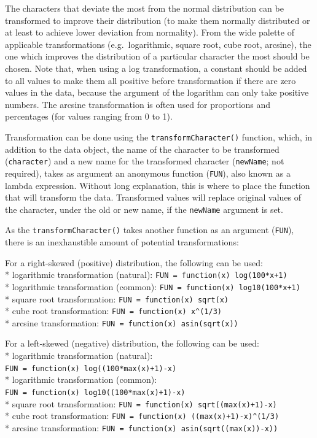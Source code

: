 \documentclass[
  11pt,
  a4paper]{article}
\begin{document}
The characters that deviate the most from the normal distribution can be
transformed to improve their distribution (to make them normally
distributed or at least to achieve lower deviation from normality). From
the wide palette of applicable transformations (e.g.~logarithmic, square
root, cube root, arcsine), the one which improves the distribution of a
particular character the most should be chosen. Note that, when using a
log transformation, a constant should be added to all values to make
them all positive before transformation if there are zero values in the
data, because the argument of the logarithm can only take positive
numbers. The arcsine transformation is often used for proportions and
percentages (for values ranging from 0 to 1).

Transformation can be done using the \texttt{transformCharacter()}
function, which, in addition to the data object, the name of the
character to be transformed (\texttt{character}) and a new name for the
transformed character (\texttt{newName}; not required), takes as
argument an anonymous function (\texttt{FUN}), also known as a lambda
expression. Without long explanation, this is where to place the
function that will transform the data. Transformed values will replace
original values of the character, under the old or new name, if the
\texttt{newName} argument is set.

As the \texttt{transformCharacter()} takes another function as an
argument (\texttt{FUN}), there is an inexhaustible amount of potential
transformations:

For a right-skewed (positive) distribution, the following can be used:\\
* logarithmic transformation (natural):
\texttt{FUN\ =\ function(x)\ log(100*x+1)}\\
* logarithmic transformation (common):
\texttt{FUN\ =\ function(x)\ log10(100*x+1)}\\
* square root transformation: \texttt{FUN\ =\ function(x)\ sqrt(x)}\\
* cube root transformation: \texttt{FUN\ =\ function(x)\ x\^{}(1/3)}\\
* arcsine transformation: \texttt{FUN\ =\ function(x)\ asin(sqrt(x))}

For a left-skewed (negative) distribution, the following can be used:\\
* logarithmic transformation (natural):
\texttt{FUN\ =\ function(x)\ log((100*max(x)+1)-x)}\\
* logarithmic transformation (common):
\texttt{FUN\ =\ function(x)\ log10((100*max(x)+1)-x)}\\
* square root transformation:
\texttt{FUN\ =\ function(x)\ sqrt((max(x)+1)-x)}\\
* cube root transformation:
\texttt{FUN\ =\ function(x)\ ((max(x)+1)-x)\^{}(1/3)}\\
* arcsine transformation:
\texttt{FUN\ =\ function(x)\ asin(sqrt((max(x))-x))}
\end{document}
